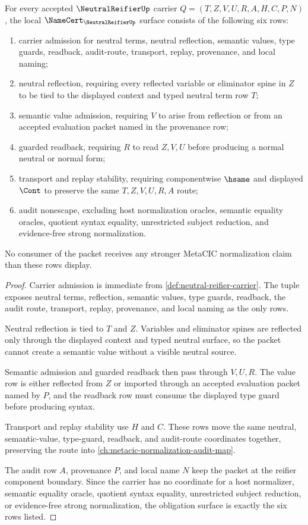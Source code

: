 \begin{theorem}
\label{thm:neutral-reifier-namecert-obligations}
For every accepted $\NeutralReifierUp$ carrier $Q=(T,Z,V,U,R,A,H,C,P,N)$, the local $\NameCert_{\NeutralReifierUp}$ surface consists of the following six rows:
\begin{enumerate}
\item carrier admission for neutral terms, neutral reflection, semantic values, type guards, readback, audit-route, transport, replay, provenance, and local naming;
\item neutral reflection, requiring every reflected variable or eliminator spine in $Z$ to be tied to the displayed context and typed neutral term row $T$;
\item semantic value admission, requiring $V$ to arise from reflection or from an accepted evaluation packet named in the provenance row;
\item guarded readback, requiring $R$ to read $Z,V,U$ before producing a normal neutral or normal form;
\item transport and replay stability, requiring componentwise $\hsame$ and displayed $\Cont$ to preserve the same $T,Z,V,U,R,A$ route;
\item audit nonescape, excluding host normalization oracles, semantic equality oracles, quotient syntax equality, unrestricted subject reduction, and evidence-free strong normalization.
\end{enumerate}
No consumer of the packet receives any stronger MetaCIC normalization claim than these rows display.
\end{theorem}
\begin{proof}
Carrier admission is immediate from \autoref{def:neutral-reifier-carrier}. The tuple exposes neutral terms, reflection, semantic values, type guards, readback, the audit route, transport, replay, provenance, and local naming as the only rows.

Neutral reflection is tied to $T$ and $Z$. Variables and eliminator spines are reflected only through the displayed context and typed neutral surface, so the packet cannot create a semantic value without a visible neutral source.

Semantic admission and guarded readback then pass through $V,U,R$. The value row is either reflected from $Z$ or imported through an accepted evaluation packet named by $P$, and the readback row must consume the displayed type guard before producing syntax.

Transport and replay stability use $H$ and $C$. These rows move the same neutral, semantic-value, type-guard, readback, and audit-route coordinates together, preserving the route into \autoref{ch:metacic-normalization-audit-map}.

The audit row $A$, provenance $P$, and local name $N$ keep the packet at the reifier component boundary. Since the carrier has no coordinate for a host normalizer, semantic equality oracle, quotient syntax equality, unrestricted subject reduction, or evidence-free strong normalization, the obligation surface is exactly the six rows listed.
\end{proof}

